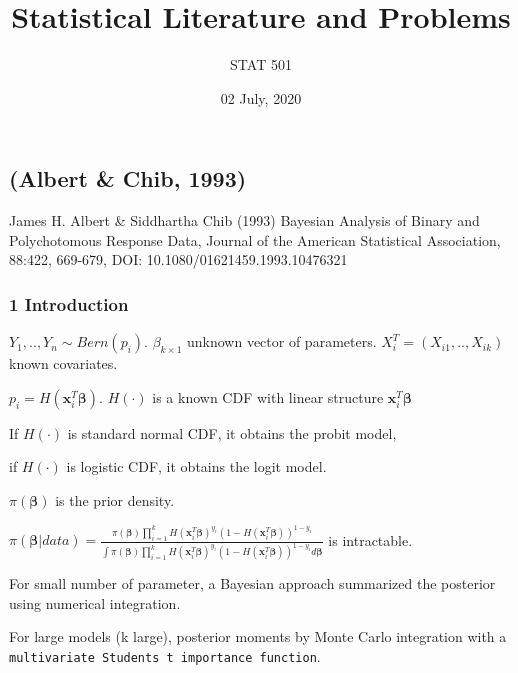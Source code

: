 \documentclass[
]{article}
\title{Statistical Literature and Problems}
\subtitle{STAT 501}
\author{}
\date{\vspace{-2.5em}02 July, 2020}
\begin{document}
\maketitle

\hypertarget{section}{%
\section{}\label{section}}

\hypertarget{albert-chib-1993}{%
\subsection{(Albert \& Chib, 1993)}\label{albert-chib-1993}}

James H. Albert \& Siddhartha Chib (1993) Bayesian Analysis of Binary
and Polychotomous Response Data, Journal of the American Statistical
Association, 88:422, 669-679, DOI: 10.1080/01621459.1993.10476321

\hypertarget{introduction}{%
\subsubsection{1 Introduction}\label{introduction}}

\(Y_1,..,Y_n\sim Bern(p_i)\). \(\beta_{k\times1}\) unknown vector of
parameters. \(X_i^T=(X_{i1},..,X_{ik})\) known covariates.

\(p_i=H(\mathbf{x}_i^T\boldsymbol{\beta})\). \(H(\cdot)\) is a known CDF
with linear structure \(\mathbf{x}_i^T\boldsymbol{\beta}\)

If \(H(\cdot)\) is standard normal CDF, it obtains the probit model,

if \(H(\cdot)\) is logistic CDF, it obtains the logit model.

\(\pi(\boldsymbol{\beta})\) is the prior density.

\(\pi(\boldsymbol{\beta}|data) = \frac{\pi(\boldsymbol{\beta})\prod_{i=1}^{k}H (\mathbf{x}_i^T\boldsymbol{\beta})^{y_i}(1-H(\mathbf{x}_i^T\boldsymbol{\beta}))^{1-y_i}}{\int\pi(\boldsymbol{\beta})\prod_{i=1}^{k}H (\mathbf{x}_i^T\boldsymbol{\beta})^{y_i}(1-H(\mathbf{x}_i^T\boldsymbol{\beta}))^{1-y_i}d\boldsymbol{\beta}}\)
is intractable.

For small number of parameter, a Bayesian approach summarized the
posterior using numerical integration.

For large models (k large), posterior moments by Monte Carlo integration
with a
\texttt{multivariate\ Student\textquotesingle{}s\ t\ importance\ function}.
\end{document}
